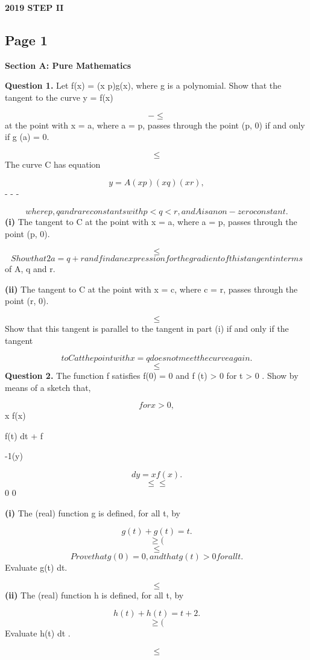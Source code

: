 \documentclass[12pt]{article}
\begin{document}
\begin{center}
{\Large \textbf{2019 STEP II}}
\end{center}

\subsection*{Page 1}
\begin{flushleft}
\bigskip\textbf{Section A: Pure Mathematics}\par
\bigskip\textbf{Question 1.} Let f(x) = (x p)g(x), where g is a polynomial. Show that the tangent to the curve y = f(x)\par
\[- \leq\]
at the point with x = a, where a = p, passes through the point (p, 0) if and only if g (a) = 0.\par
\[\leq\]
The curve C has equation\par
\[y = A(x p)(x q)(x r),\]
- - -\par
\[where p, q and r are constants with p < q < r, and A is a non-zero constant.\]
\textbf{(i)} The tangent to C at the point with x = a, where a = p, passes through the point (p, 0).\par
\[\leq\]
\[Show that 2a = q + r and find an expression for the gradient of this tangent in terms\]
of A, q and r.\par
\textbf{(ii)} The tangent to C at the point with x = c, where c = r, passes through the point (r, 0).\par
\[\leq\]
Show that this tangent is parallel to the tangent in part (i) if and only if the tangent\par
\[to C at the point with x = q does not meet the curve again.\]
\[\leq\]
\bigskip\textbf{Question 2.} The function f satisfies f(0) = 0 and f (t) > 0 for t > 0 . Show by means of a sketch that,\par
\[for x > 0,\]
x f(x)\par
f(t) dt + f\par
-1(y)\par
\[dy = xf(x).\]
\[\leq \leq\]
0 0\par
\textbf{(i)} The (real) function g is defined, for all t, by\par
\[g(t) + g(t) = t.\]
\[\geq (\]
\[\leq\]
\[Prove that g(0) = 0 , and that g (t) > 0 for all t.\]
Evaluate g(t) dt.\par
\[\leq\]
\textbf{(ii)} The (real) function h is defined, for all t, by\par
\[h(t) + h(t) = t + 2.\]
\[\geq (\]
Evaluate h(t) dt .\par
\[\leq\]
\end{flushleft}
\end{document}
